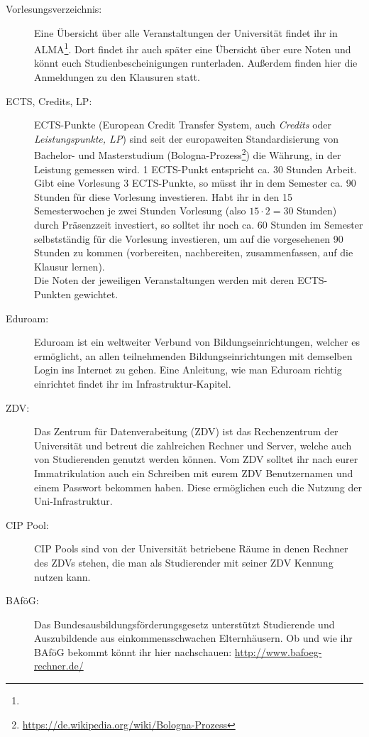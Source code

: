 \begin{description}
\item [Vorlesungsverzeichnis:] Eine Übersicht über alle Veranstaltungen der Universität findet ihr in ALMA\footnote{}. Dort findet ihr auch später eine Übersicht über eure Noten und könnt euch Studienbescheinigungen runterladen. Außerdem finden hier die Anmeldungen zu den Klausuren statt.	%

\item [ECTS, Credits, LP:] ECTS-Punkte (European Credit Transfer System, auch \textit{Credits} oder \textit{Leistungspunkte, LP}) sind seit der europaweiten Standardisierung von Bachelor- und Masterstudium (Bologna-Prozess\footnote{\url{https://de.wikipedia.org/wiki/Bologna-Prozess}}) die Währung, in der Leistung gemessen wird. 1 ECTS-Punkt entspricht ca. 30 Stunden Arbeit. Gibt eine Vorlesung 3 ECTS-Punkte, so müsst ihr in dem Semester ca. 90 Stunden für diese Vorlesung investieren. Habt ihr in den 15 Semesterwochen je zwei Stunden Vorlesung (also $15\cdot 2=30$ Stunden) durch Präsenzzeit investiert, so solltet ihr noch ca. 60 Stunden im Semester selbstständig für die Vorlesung investieren, um auf die vorgesehenen 90 Stunden zu kommen (vorbereiten, nachbereiten, zusammenfassen, auf die Klausur lernen).\\	%
Die Noten der jeweiligen Veranstaltungen werden mit deren ECTS-Punkten gewichtet.
 
\item [Eduroam:] Eduroam ist ein weltweiter Verbund von Bildungseinrichtungen, welcher es ermöglicht, an allen teilnehmenden Bildungseinrichtungen mit demselben Login ins Internet zu gehen.
Eine Anleitung, wie man Eduroam richtig einrichtet findet ihr im Infrastruktur-Kapitel.

\item [ZDV:] Das Zentrum für Datenverabeitung (ZDV) ist das Rechenzentrum der Universität und betreut die zahlreichen Rechner und Server, welche auch von Studierenden genutzt werden können. Vom ZDV solltet ihr nach eurer Immatrikulation auch ein Schreiben mit eurem ZDV Benutzernamen und einem Passwort bekommen haben. Diese ermöglichen euch die Nutzung der Uni-Infrastruktur.

\item [CIP Pool:] CIP Pools sind von der Universität betriebene Räume in denen Rechner des ZDVs stehen, die man als Studierender mit seiner ZDV Kennung nutzen kann.

\item[BAföG:] Das Bundesausbildungsförderungsgesetz unterstützt Studierende und Auszubildende aus einkommensschwachen Elternhäusern. Ob und wie ihr BAföG bekommt könnt ihr hier nachschauen: \url{http://www.bafoeg-rechner.de/}	%


\end{description}
